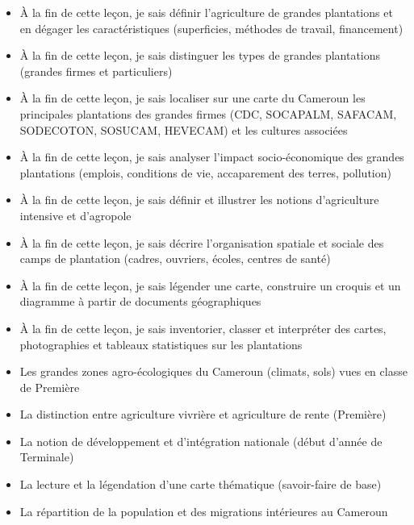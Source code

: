 \documentclass[11pt]{article}
\begin{document}
\begin{objectifs}
\begin{itemize}
\item À la fin de cette leçon, je sais définir l'agriculture de grandes plantations et en dégager les caractéristiques (superficies, méthodes de travail, financement)
\item À la fin de cette leçon, je sais distinguer les types de grandes plantations (grandes firmes et particuliers)
\item À la fin de cette leçon, je sais localiser sur une carte du Cameroun les principales plantations des grandes firmes (CDC, SOCAPALM, SAFACAM, SODECOTON, SOSUCAM, HEVECAM) et les cultures associées
\item À la fin de cette leçon, je sais analyser l'impact socio-économique des grandes plantations (emplois, conditions de vie, accaparement des terres, pollution)
\item À la fin de cette leçon, je sais définir et illustrer les notions d'agriculture intensive et d'agropole
\item À la fin de cette leçon, je sais décrire l'organisation spatiale et sociale des camps de plantation (cadres, ouvriers, écoles, centres de santé)
\item À la fin de cette leçon, je sais légender une carte, construire un croquis et un diagramme à partir de documents géographiques
\item À la fin de cette leçon, je sais inventorier, classer et interpréter des cartes, photographies et tableaux statistiques sur les plantations
\end{itemize}
\end{objectifs}

\begin{prerequis}
\begin{itemize}
\item Les grandes zones agro-écologiques du Cameroun (climats, sols) vues en classe de Première
\item La distinction entre agriculture vivrière et agriculture de rente (Première)
\item La notion de développement et d'intégration nationale (début d'année de Terminale)
\item La lecture et la légendation d'une carte thématique (savoir-faire de base)
\item La répartition de la population et des migrations intérieures au Cameroun
\end{itemize}
\end{prerequis}
\end{document}
